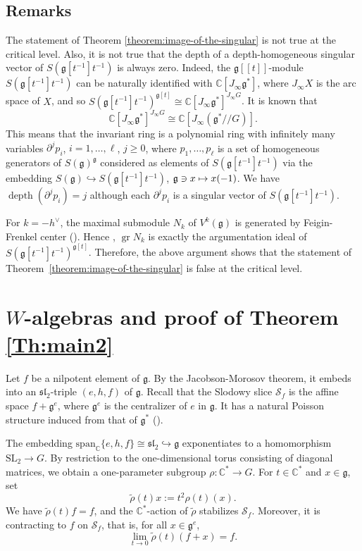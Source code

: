 \documentclass[11pt]{article}
\numberwithin{equation}{section}
\let\oldvee\vee
\renewcommand{\vee}{{\scriptscriptstyle\oldvee}}
\newcommand{\lcr}{[\![}
\newcommand{\rcr}{]\!]}
\newcommand\mto{\mathchoice{\longmapsto}{\mapsto}{\mapsto}{\mapsto}}
\let\on\operatorname
\newcommand\C{{\mathbb C}}
\newcommand \g{\mathfrak g}
\theoremstyle{definition}
\begin{document}
\subsection{Remarks}\label{subsection:remark}
The statement of Theorem \ref{theorem:image-of-the-singular}
is not true at the critical level.
Also,
it is not true that
the depth of a depth-homogeneous singular vector of $S(\g[t^{-1}]t^{-1})$ is
always zero.
Indeed,
the $\g\lcr t\rcr$-module
$S(\g[t^{-1}]t^{-1})$
can be naturally identified with $\C[J_{\infty}\g^*]$,
where $J_{\infty}X$ is the arc space of $X$,
and so
$S(\g[t^{-1}]t^{-1})^{\g[t]}\cong \C[J_{\infty}\g^*]^{J_{\infty}G}$.
It is known \cite{RaiTau92,BeiDri,EisFre01} that
\begin{equation*}
\C[J_{\infty}\g^*]^{J_{\infty}G}\cong \C[J_{\infty}(\g^*/\!/G)].
\end{equation*}
This means that
the invariant ring is a polynomial ring with infinitely many
variables
$\partial^j p_i$,
$i=1,\dots, \ell$,
$j\geq 0$,
where
$p_1,\dots, p_{\ell}$ is a set of homogeneous generators of
$S(\g)^\g$
considered as elements of
$S(\g[t^{-1}]t^{-1})$ via the embedding
$S(\g)\hookrightarrow S(\g[t^{-1}]t^{-1})$,
$\g\ni x\mto x(-1)$.
We have $\on{depth}(\partial^j p_i)=j$
although
each $\partial^j p_i$ is a singular vector
of $S(\g[t^{-1}]t^{-1})$.

For $k=-h^{\vee}$,
the maximal submodule $N_k$ of $V^k(\g)$
is generated by Feigin-Frenkel center (\cite{FreGai04}).
Hence \cite{FeiFre92,Fre05},
$\on{gr}N_{k}$ is exactly the
argumentation ideal of
$S(\g[t^{-1}]t^{-1})^{\g[t]}$.
Therefore,
the above argument shows that
the statement of Theorem~\ref{theorem:image-of-the-singular}
is false at the critical level.

\section{\texorpdfstring{$W$}{W}-algebras and proof of Theorem \ref{Th:main2}}
\label{sec:W-algebras}
Let $f$ be a nilpotent element of $\g$. By the Jacobson-Morosov theorem,
it embeds into an $\mathfrak{sl}_2$-triple $(e,h,f)$ of $\g$.
Recall that the Slodowy slice $\mathscr{S}_f$ is the affine space $f+\g^{e}$,
where $\g^{e}$ is the centralizer of $e$ in $\g$.
It has a natural Poisson structure induced from that of $\g^*$ (\cite{GanGin02}).

The embedding $\mathrm{span}_\C\{e,h,f\}
\cong \mathfrak{sl}_2 \hookrightarrow \g$
exponentiates to a homomorphism
\hbox{$\mathrm{SL}_2\!\to\!G$}. By restriction to the one-dimensional
torus consisting of diagonal matrices, we obtain
a one-parameter subgroup $\rho \colon \C^* \to G$.
For $t\in\C^*$ and $x\in\g$, set
\begin{equation*} \label{eq:rho}
\tilde{\rho}(t)x := t^{2} \rho(t)(x).
\end{equation*}
We have
$\tilde{\rho}(t)f=f$, and
the $\C^*$-action of $\tilde{\rho}$ stabilizes $\mathscr{S}_f$.
Moreover, it is contracting to $f$ on $\mathscr{S}_f$, that is, for all $x\in\g^{e}$,
\[
\lim_{t\to 0} \tilde{\rho}(t)(f+x)=f.
\]
\end{document}
